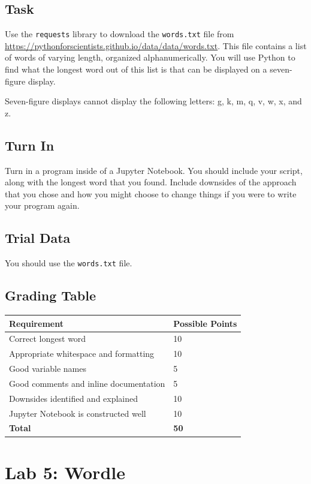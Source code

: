 \subsection*{Task}
Use the \verb|requests| library to download the \verb|words.txt| file from \\\href{https://pythonforscientists.github.io/data/data/words.txt}{https://pythonforscientists.github.io/data/data/words.txt}. This file contains a list of words of varying length, organized alphanumerically. You will use Python to find what the longest word out of this list is that can be displayed on a seven-figure display.\par
Seven-figure displays cannot display the following letters: g, k, m, q, v, w, x, and z.
\subsection*{Turn In}
Turn in a program inside of a Jupyter Notebook. You should include your script, along with the longest word that you found. Include downsides of the approach that you chose and how you might choose to change things if you were to write your program again.
\subsection*{Trial Data}
You should use the \verb|words.txt| file.
\subsection*{Grading Table}
\begin{tabular}{|l|l|}
\hline
Requirement & Possible Points \\ \hline
Correct longest word & 10 \\ \hline
Appropriate whitespace and formatting & 10 \\ \hline
Good variable names & 5 \\ \hline
Good comments and inline documentation & 5 \\ \hline
Downsides identified and explained & 10 \\ \hline
Jupyter Notebook is constructed well & 10 \\ \hline
\hline
\textbf{Total} & \textbf{50} \\ \hline
\end{tabular}

\section*{Lab 5: Wordle}
